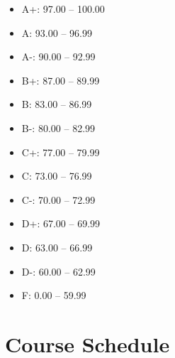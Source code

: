\documentclass[12pt, letterpaper]{article}
\begin{document}
\begin{itemize}
    \item A+: 97.00 -- 100.00
    \item A: 93.00 -- 96.99
    \item A-: 90.00 -- 92.99
    \item B+: 87.00 -- 89.99
    \item B: 83.00 -- 86.99
    \item B-: 80.00 -- 82.99
    \item C+: 77.00 -- 79.99
    \item C: 73.00 -- 76.99
    \item C-: 70.00 -- 72.99
    \item D+: 67.00 -- 69.99
    \item D: 63.00 -- 66.99
    \item D-: 60.00 -- 62.99
    \item F: 0.00 -- 59.99
\end{itemize}

\section{Course Schedule}
\end{document}
